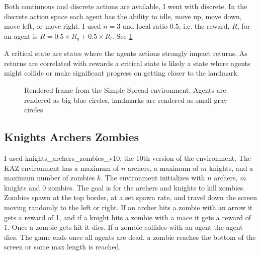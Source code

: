 \documentclass[UKenglish]{uiomasterthesis}
\begin{document}
Both continuous and discrete actions are available, I went with discrete. In the discrete action space each agent has the ability to idle, move up, move down, move left, or move right. I used $n=3$ and local ratio $0.5$, i.e. the reward, $R$, for an agent is $R = 0.5\times R_g + 0.5\times R_l$. See \cref{fig:simple_spread_env}

A critical state are states where the agents actions strongly impact returns. As returns are correlated with rewards a critical state is likely a state where agents might collide or make significant progress on getting closer to the landmark.

\begin{figure}[H]
    \centering
    \caption{Rendered frame from the Simple Spread environment. Agents are rendered as big blue circles, landmarks are rendered as small gray circles}
    \label{fig:simple_spread_env}
\end{figure}

\subsection{Knights Archers Zombies}
\label{sec:kaz_env}
I used knights\_archers\_zombies\_v10, the 10th version of the environment. The KAZ environment has a maximum of $n$ archers, a maximum of $m$ knights, and a maximum number of zombies $k$. The environment initializes with $n$ archers, $m$ knights and 0 zombies. The goal is for the archers and knights to kill zombies. Zombies spawn at the top border, at a set spawn rate, and travel down the screen moving randomly to the left or right. If an archer hits a zombie with an arrow it gets a reward of 1, and if a knight hits a zombie with a mace it gets a reward of 1. Once a zombie gets hit it dies. If a zombie collides with an agent the agent dies. The game ends once all agents are dead, a zombie reaches the bottom of the screen or some max length is reached.
\end{document}
